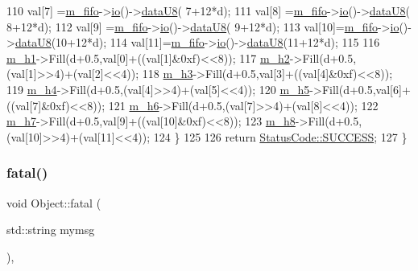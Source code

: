 \begin{DoxyCode}
110     val[7] =\hyperlink{classStorageFifo_a4b1f3eb44df4f2d46a8a62189d662390}{m\_fifo}->\hyperlink{classIOobject_af04fb94137c3d86849f478ac5afab5d1}{io}()->\hyperlink{classIOdata_a75e9c318dbac3a39402179070943d4bc}{dataU8}( 7+12*d);
111     val[8] =\hyperlink{classStorageFifo_a4b1f3eb44df4f2d46a8a62189d662390}{m\_fifo}->\hyperlink{classIOobject_af04fb94137c3d86849f478ac5afab5d1}{io}()->\hyperlink{classIOdata_a75e9c318dbac3a39402179070943d4bc}{dataU8}( 8+12*d);
112     val[9] =\hyperlink{classStorageFifo_a4b1f3eb44df4f2d46a8a62189d662390}{m\_fifo}->\hyperlink{classIOobject_af04fb94137c3d86849f478ac5afab5d1}{io}()->\hyperlink{classIOdata_a75e9c318dbac3a39402179070943d4bc}{dataU8}( 9+12*d);
113     val[10]=\hyperlink{classStorageFifo_a4b1f3eb44df4f2d46a8a62189d662390}{m\_fifo}->\hyperlink{classIOobject_af04fb94137c3d86849f478ac5afab5d1}{io}()->\hyperlink{classIOdata_a75e9c318dbac3a39402179070943d4bc}{dataU8}(10+12*d);
114     val[11]=\hyperlink{classStorageFifo_a4b1f3eb44df4f2d46a8a62189d662390}{m\_fifo}->\hyperlink{classIOobject_af04fb94137c3d86849f478ac5afab5d1}{io}()->\hyperlink{classIOdata_a75e9c318dbac3a39402179070943d4bc}{dataU8}(11+12*d);
115     
116     \hyperlink{classStorageFifo_abe762844e442bc8188643b18b276d801}{m\_h1}->Fill(d+0.5,val[0]+((val[1]&0xf)<<8));
117     \hyperlink{classStorageFifo_a3caf6211541aaa4be8e60c03d79bf253}{m\_h2}->Fill(d+0.5,(val[1]>>4)+(val[2]<<4));
118     \hyperlink{classStorageFifo_a7e6b54c96a9b53a9917f7f21bda12b2e}{m\_h3}->Fill(d+0.5,val[3]+((val[4]&0xf)<<8));
119     \hyperlink{classStorageFifo_ad026ffc1c7590bb3563538490be9aa00}{m\_h4}->Fill(d+0.5,(val[4]>>4)+(val[5]<<4));
120     \hyperlink{classStorageFifo_ae9133c5421f9fa166b837933706d2a59}{m\_h5}->Fill(d+0.5,val[6]+((val[7]&0xf)<<8));
121     \hyperlink{classStorageFifo_a39ca376b2a74643c54e4df2dfabf0906}{m\_h6}->Fill(d+0.5,(val[7]>>4)+(val[8]<<4));
122     \hyperlink{classStorageFifo_a01784ff4138a1b32eb517931b5866cc6}{m\_h7}->Fill(d+0.5,val[9]+((val[10]&0xf)<<8));
123     \hyperlink{classStorageFifo_aeef4b7183e14d05bab673d948d85b84c}{m\_h8}->Fill(d+0.5,(val[10]>>4)+(val[11]<<4));
124   \}
125   
126   \textcolor{keywordflow}{return} \hyperlink{classStatusCode_a6f565cbeadc76d14c72f047e5e85eb4badd0da38d3ba0d922efd1f4619bc37ad8}{StatusCode::SUCCESS};
127 \}
\end{DoxyCode}
\mbox{\label{classObject_aad5a16aac7516ce65bd5ec02ab07fc80}} 
\subsubsection{\texorpdfstring{fatal()}{fatal()}\hspace{0.1cm}{\footnotesize\ttfamily [1/2]}}
{\footnotesize\ttfamily void Object\+::fatal (\begin{DoxyParamCaption}\item[{std\+::string}]{mymsg }\end{DoxyParamCaption})\hspace{0.3cm}{\ttfamily [inline]}, {\ttfamily [inherited]}}



